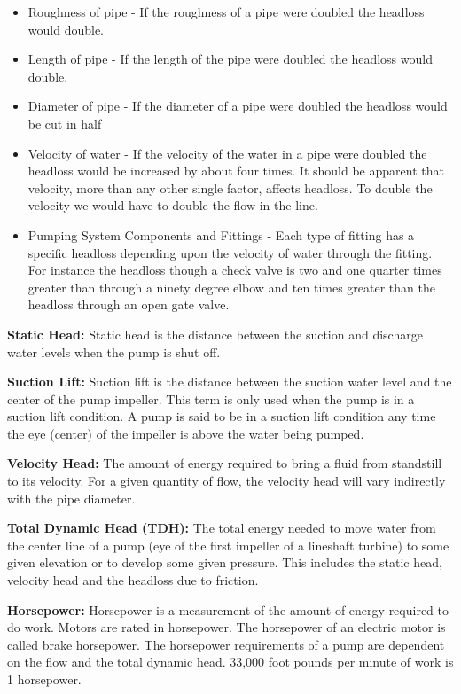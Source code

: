 \begin{itemize}
  \item Roughness of pipe - If the roughness of a pipe were doubled the headloss would double.

  \item Length of pipe - If the length of the pipe were doubled the headloss would double.

  \item Diameter of pipe - If the diameter of a pipe were doubled the headloss would be cut in half

  \item Velocity of water - If the velocity of the water in a pipe were doubled the headloss would be increased by about four times. It should be apparent that velocity, more than any other single factor, affects headloss. To double the velocity we would have to double the flow in the line.
  
  \item Pumping System Components and Fittings - Each type of fitting has a specific headloss depending upon the velocity of water through the fitting. For instance the headloss though a check valve is two and one quarter times greater than through a ninety degree elbow and ten times greater than the headloss through an open gate valve.

\end{itemize}

\textbf{Static Head: }  Static head is the distance between the suction and discharge water levels when the pump is shut off. 

\textbf{Suction Lift: } Suction lift is the distance between the suction water level and the center of the pump impeller. This term is only used when the pump is in a suction lift condition. A pump is said to be in a suction lift condition any time the eye (center) of the impeller is above the water being pumped.

\textbf{Velocity Head: } The amount of energy required to bring a fluid from standstill to its velocity. For a given quantity of flow, the velocity head will vary indirectly with the pipe diameter.

\textbf{Total Dynamic Head (TDH):}  The total energy needed to move water from the center line of a pump (eye of the first impeller of a lineshaft turbine) to some given elevation or to develop some given pressure. This includes the static head, velocity head and the headloss due to friction. 

\textbf{Horsepower: } Horsepower is a measurement of the amount of energy required to do work. Motors are rated in horsepower. The horsepower of an electric motor is called brake horsepower. The horsepower requirements of a pump are dependent on the flow and the total dynamic head.  33,000 foot pounds per minute of work is 1 horsepower.

